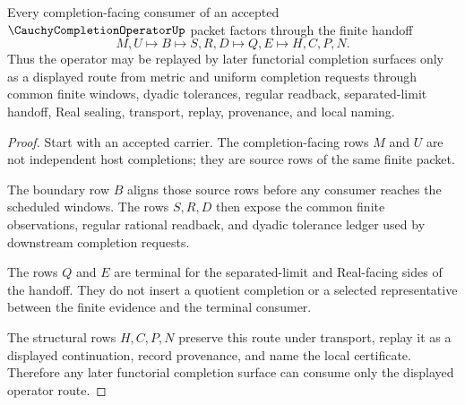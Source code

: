 \begin{theorem}
\label{thm:cauchy-completion-operator-functorial-handoff}
Every completion-facing consumer of an accepted $\CauchyCompletionOperatorUp$ packet factors through the finite handoff
$$
M,U \longmapsto B \longmapsto S,R,D \longmapsto Q,E \longmapsto H,C,P,N .
$$
Thus the operator may be replayed by later functorial completion surfaces only as a displayed route from metric and uniform completion requests through common finite windows, dyadic tolerances, regular readback, separated-limit handoff, Real sealing, transport, replay, provenance, and local naming.
\end{theorem}
\begin{proof}
Start with an accepted carrier. The completion-facing rows $M$ and $U$ are not independent host completions; they are source rows of the same finite packet.

The boundary row $B$ aligns those source rows before any consumer reaches the scheduled windows. The rows $S,R,D$ then expose the common finite observations, regular rational readback, and dyadic tolerance ledger used by downstream completion requests.

The rows $Q$ and $E$ are terminal for the separated-limit and Real-facing sides of the handoff. They do not insert a quotient completion or a selected representative between the finite evidence and the terminal consumer.

The structural rows $H,C,P,N$ preserve this route under transport, replay it as a displayed continuation, record provenance, and name the local certificate. Therefore any later functorial completion surface can consume only the displayed operator route.
\end{proof}

